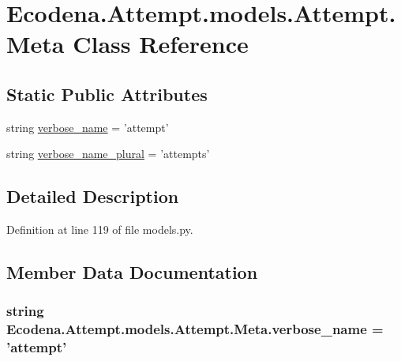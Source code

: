 \hypertarget{class_ecodena_1_1_attempt_1_1models_1_1_attempt_1_1_meta}{
\section{Ecodena.Attempt.models.Attempt.Meta Class Reference}
\label{d9/d75/class_ecodena_1_1_attempt_1_1models_1_1_attempt_1_1_meta}
}
\subsection*{Static Public Attributes}
\begin{DoxyCompactItemize}
\item 
string \hyperlink{class_ecodena_1_1_attempt_1_1models_1_1_attempt_1_1_meta_adaf86eddd52ba00b4a504002b7e5ba35}{verbose\_\-name} = 'attempt'
\item 
string \hyperlink{class_ecodena_1_1_attempt_1_1models_1_1_attempt_1_1_meta_a6c17e0ddf87e78bbb89ec50ff652dd5c}{verbose\_\-name\_\-plural} = 'attempts'
\end{DoxyCompactItemize}


\subsection{Detailed Description}


Definition at line 119 of file models.py.



\subsection{Member Data Documentation}
\hypertarget{class_ecodena_1_1_attempt_1_1models_1_1_attempt_1_1_meta_adaf86eddd52ba00b4a504002b7e5ba35}{
\subsubsection[{verbose\_\-name}]{\setlength{\rightskip}{0pt plus 5cm}string {\bf Ecodena.Attempt.models.Attempt.Meta.verbose\_\-name} = 'attempt'}}
\label{d9/d75/class_ecodena_1_1_attempt_1_1models_1_1_attempt_1_1_meta_adaf86eddd52ba00b4a504002b7e5ba35}


